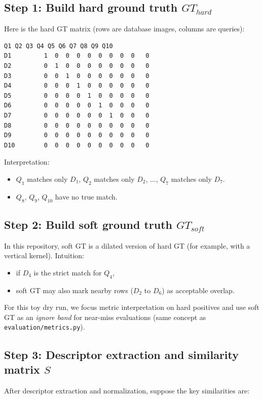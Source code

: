 \documentclass[11pt]{article}
\newcommand{\file}[1]{\texttt{#1}}
\begin{document}
\subsection{Step 1: Build hard ground truth \texorpdfstring{$GT_{hard}$}{GThard}}
Here is the hard GT matrix (rows are database images, columns are queries):

\begin{lstlisting}[style=repo, caption={Contrived hard GT matrix (1 = true match)}]
          Q1 Q2 Q3 Q4 Q5 Q6 Q7 Q8 Q9 Q10
D1         1  0  0  0  0  0  0  0  0   0
D2         0  1  0  0  0  0  0  0  0   0
D3         0  0  1  0  0  0  0  0  0   0
D4         0  0  0  1  0  0  0  0  0   0
D5         0  0  0  0  1  0  0  0  0   0
D6         0  0  0  0  0  1  0  0  0   0
D7         0  0  0  0  0  0  1  0  0   0
D8         0  0  0  0  0  0  0  0  0   0
D9         0  0  0  0  0  0  0  0  0   0
D10        0  0  0  0  0  0  0  0  0   0
\end{lstlisting}

Interpretation:
\begin{itemize}[leftmargin=*]
  \item $Q_1$ matches only $D_1$, $Q_2$ matches only $D_2$, ..., $Q_7$ matches only $D_7$.
  \item $Q_8$, $Q_9$, $Q_{10}$ have no true match.
\end{itemize}

\subsection{Step 2: Build soft ground truth \texorpdfstring{$GT_{soft}$}{GTsoft}}
In this repository, soft GT is a dilated version of hard GT (for example, with a vertical kernel). Intuition:
\begin{itemize}[leftmargin=*]
  \item if $D_4$ is the strict match for $Q_4$,
  \item soft GT may also mark nearby rows ($D_2$ to $D_6$) as acceptable overlap.
\end{itemize}

For this toy dry run, we focus metric interpretation on hard positives and use soft GT as an \emph{ignore band} for near-miss evaluations (same concept as \file{evaluation/metrics.py}).

\subsection{Step 3: Descriptor extraction and similarity matrix \texorpdfstring{$S$}{S}}
After descriptor extraction and normalization, suppose the key similarities are:
\end{document}

